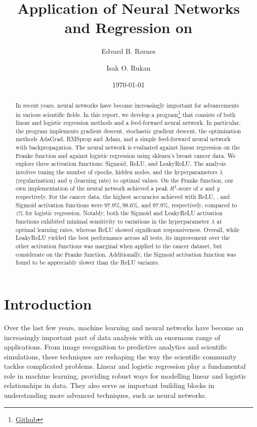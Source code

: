 \documentclass[%
reprint,s
amsmath,amssymb,
aps,
]{revtex4-2}
\begin{document}
	
\title{Application of Neural Networks and Regression on}
\author{Edvard B. Rørnes}
\author{Isak O. Rukan}
\date{\today}

\begin{abstract}
	In recent years, neural networks have become increasingly important for advancements in various scientific fields. In this report, we develop a program\footnote{\href{https://github.com/EdvardRornes/FYS-STK4155/tree/main/Project1}{Github}} that consists of both linear and logistic regression methods and a feed-forward neural network. In particular, the program implements gradient descent, stochastic gradient descent, the optimization methods AdaGrad, RMSprop and Adam, and a simple feed-forward neural network with backpropagation. The neural network is evaluated against linear regression on the Franke function and against logistic regression using sklearn's breast cancer data. We explore three activation functions: Sigmoid, ReLU, and LeakyReLU. The analysis involves tuning the number of epochs, hidden nodes, and the hyperparameters $\lambda$ (regularization) and $\eta$ (learning rate) to optimal values. On the Franke function, our own implementation of the neural network achieved a peak $R^2$-score of $x$ and $y$ respectively. For the cancer data, the highest accuracies achieved with ReLU, , and Sigmoid activation functions were $97.9\%, 98.6\%$, and $97.9\%$, respectively, compared to $z\%$ for logistic regression. Notably, both the Sigmoid and LeakyReLU activation functions exhibited minimal sensitivity to variations in the hyperparameter $\lambda$ at optimal learning rates, whereas ReLU showed significant responsiveness. Overall, while LeakyReLU yielded the best performance across all tests, its improvement over the other activation functions was marginal when applied to the cancer dataset, but considerate on the Franke function. Additionally, the Sigmoid activation function was found to be appreciably slower than the ReLU variants.
\end{abstract}

\maketitle

\section{Introduction}
Over the last few years, machine learning and neural networks have become an increasingly important part of data analysis with an enormous range of applications. From image recognition to predictive analytics and scientific simulations, these techniques are reshaping the way the scientific community tackles complicated problems. Linear and logistic regression play a fundamental role in machine learning, providing robust ways for modelling linear and logistic relationships in data. They also serve as important building blocks in understanding more advanced techniques, such as neural networks. 
\end{document}
